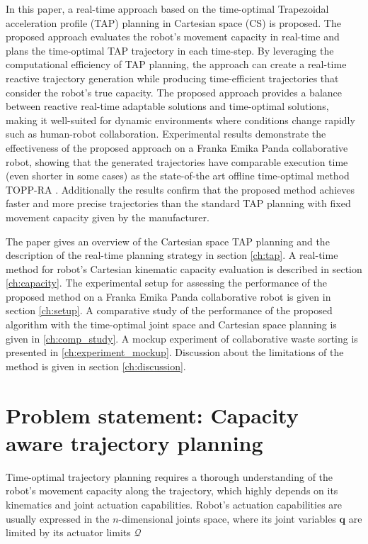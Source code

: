 In this paper, a real-time approach based on the time-optimal Trapezoidal acceleration profile (TAP) \cite{modernrobotics} planning in Cartesian space (CS) is proposed. The proposed approach evaluates the robot's movement capacity in real-time and plans the time-optimal TAP trajectory in each time-step. By leveraging the computational efficiency of TAP planning, the approach can create a real-time reactive trajectory generation while producing time-efficient trajectories that consider the robot's true capacity. The proposed approach provides a balance between reactive real-time adaptable solutions and time-optimal solutions, making it well-suited for dynamic environments where conditions change rapidly such as human-robot collaboration. 
Experimental results demonstrate the effectiveness of the proposed approach on a Franka Emika Panda collaborative robot, showing that the generated trajectories have comparable execution time (even shorter in some cases) as the state-of-the art offline time-optimal method TOPP-RA \cite{Pham2018}. Additionally the results confirm that the proposed method achieves faster and more precise trajectories than the standard TAP planning with fixed movement capacity given by the manufacturer. 


The paper gives an overview of the Cartesian space TAP planning and the description of the real-time planning strategy in section \ref{ch:tap}. A real-time method for robot's Cartesian kinematic capacity evaluation is described in section \ref{ch:capacity}. The experimental setup for assessing the performance of the proposed method on a Franka Emika Panda collaborative robot is given in section \ref{ch:setup}. A comparative study of the performance of the proposed algorithm with the time-optimal joint space and Cartesian space planning is given in \ref{ch:comp_study}. A mockup experiment of collaborative waste sorting is presented in \ref{ch:experiment_mockup}. Discussion about the limitations of the method is given in section \ref{ch:discussion}.


\section{Problem statement: Capacity aware trajectory planning }\label{ch:problem_statement}

Time-optimal trajectory planning requires a thorough understanding of the robot's movement capacity along the trajectory, which highly depends on its kinematics and joint actuation capabilities. Robot's actuation capabilities are usually expressed in the $n$-dimensional joints space, where its joint variables $\bm{q}$ are limited by its actuator limits $\mathcal{Q}$

